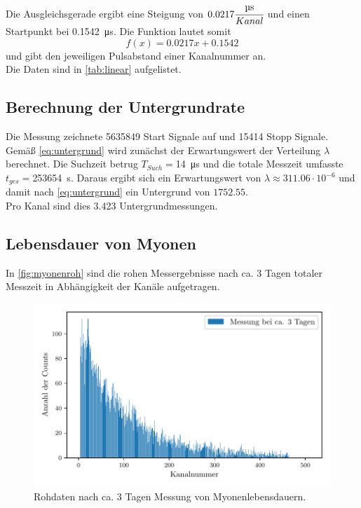 Die Ausgleichsgerade ergibt eine Steigung von $0.0217\cfrac{\si{\micro\second}}{Kanal}$ und einen Startpunkt bei \SI{0.1542}{\micro\second}.
Die Funktion lautet somit
\begin{equation}
    f(x) = 0.0217x + 0.1542
\end{equation}
und gibt den jeweiligen Pulsabstand einer Kanalnummer an.\\
Die Daten sind in \autoref{tab:linear} aufgelistet.

\subsection{Berechnung der Untergrundrate}
Die Messung zeichnete 5635849 Start Signale auf und 15414 Stopp Signale.\\
Gemäß \autoref{eq:untergrund} wird zunächst der Erwartungswert der Verteilung $\lambda$ berechnet.
Die Suchzeit betrug $T_{Such} = $\SI{14}{\micro\second} und die totale Messzeit umfasste $t_{ges} = $\SI{253654}{\second}.
Daraus ergibt sich ein Erwartungswert von $\lambda \approx 311.06\cdot 10^{-6}$ und damit nach \autoref{eq:untergrund} ein Untergrund von $1752.55$.\\
Pro Kanal sind dies 3.423 Untergrundmessungen.

\subsection{Lebensdauer von Myonen}
In \autoref{fig:myonenroh} sind die rohen Messergebnisse nach ca. 3 Tagen totaler Messzeit in Abhängigkeit der Kanäle aufgetragen.

\begin{figure}[H]
    \centering
    \includegraphics{images/messung_roh.pdf}
    \caption{Rohdaten nach ca. 3 Tagen Messung von Myonenlebensdauern.}
    \label{fig:myonenroh}
\end{figure}

